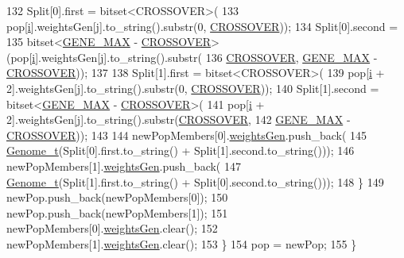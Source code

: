 \begin{DoxyCode}
132       Split[0].first = bitset<CROSSOVER>(
133           pop[\hyperlink{_comparision_pictures_2_createtest_image_8m_a6f6ccfcf58b31cb6412107d9d5281426}{i}].weightsGen[\hyperlink{_comparision_pictures_2_createtest_image_8m_ac86694252f8dfdb19aaeadc4b7c342c6}{j}].to\_string().substr(0, \hyperlink{_soil_math_types_8h_ae84e527452fcf9dfc8ef8fd0dd5cd598}{CROSSOVER}));
134       Split[0].second =
135           bitset<\hyperlink{_soil_math_types_8h_aa5e1eb1a998e5ed69af2076cf318df4b}{GENE\_MAX} - \hyperlink{_soil_math_types_8h_ae84e527452fcf9dfc8ef8fd0dd5cd598}{CROSSOVER}>(pop[\hyperlink{_comparision_pictures_2_createtest_image_8m_a6f6ccfcf58b31cb6412107d9d5281426}{i}].weightsGen[\hyperlink{_comparision_pictures_2_createtest_image_8m_ac86694252f8dfdb19aaeadc4b7c342c6}{j}].to\_string().substr(
136               \hyperlink{_soil_math_types_8h_ae84e527452fcf9dfc8ef8fd0dd5cd598}{CROSSOVER}, \hyperlink{_soil_math_types_8h_aa5e1eb1a998e5ed69af2076cf318df4b}{GENE\_MAX} - \hyperlink{_soil_math_types_8h_ae84e527452fcf9dfc8ef8fd0dd5cd598}{CROSSOVER}));
137 
138       Split[1].first = bitset<CROSSOVER>(
139           pop[\hyperlink{_comparision_pictures_2_createtest_image_8m_a6f6ccfcf58b31cb6412107d9d5281426}{i} + 2].weightsGen[\hyperlink{_comparision_pictures_2_createtest_image_8m_ac86694252f8dfdb19aaeadc4b7c342c6}{j}].to\_string().substr(0, \hyperlink{_soil_math_types_8h_ae84e527452fcf9dfc8ef8fd0dd5cd598}{CROSSOVER}));
140       Split[1].second = bitset<\hyperlink{_soil_math_types_8h_aa5e1eb1a998e5ed69af2076cf318df4b}{GENE\_MAX} - \hyperlink{_soil_math_types_8h_ae84e527452fcf9dfc8ef8fd0dd5cd598}{CROSSOVER}>(
141           pop[\hyperlink{_comparision_pictures_2_createtest_image_8m_a6f6ccfcf58b31cb6412107d9d5281426}{i} + 2].weightsGen[\hyperlink{_comparision_pictures_2_createtest_image_8m_ac86694252f8dfdb19aaeadc4b7c342c6}{j}].to\_string().substr(\hyperlink{_soil_math_types_8h_ae84e527452fcf9dfc8ef8fd0dd5cd598}{CROSSOVER},
142                                                       \hyperlink{_soil_math_types_8h_aa5e1eb1a998e5ed69af2076cf318df4b}{GENE\_MAX} - 
      \hyperlink{_soil_math_types_8h_ae84e527452fcf9dfc8ef8fd0dd5cd598}{CROSSOVER}));
143 
144       newPopMembers[0].\hyperlink{struct_pop_member_struct_a072fadb4863e0cf77b55ad3b46b62522}{weightsGen}.push\_back(
145           \hyperlink{_soil_math_types_8h_a58f6ab36d2cb0527a73caec36d14a0e0}{Genome\_t}(Split[0].first.to\_string() + Split[1].second.to\_string()));
146       newPopMembers[1].\hyperlink{struct_pop_member_struct_a072fadb4863e0cf77b55ad3b46b62522}{weightsGen}.push\_back(
147           \hyperlink{_soil_math_types_8h_a58f6ab36d2cb0527a73caec36d14a0e0}{Genome\_t}(Split[1].first.to\_string() + Split[0].second.to\_string()));
148     \}
149     newPop.push\_back(newPopMembers[0]);
150     newPop.push\_back(newPopMembers[1]);
151     newPopMembers[0].\hyperlink{struct_pop_member_struct_a072fadb4863e0cf77b55ad3b46b62522}{weightsGen}.clear();
152     newPopMembers[1].\hyperlink{struct_pop_member_struct_a072fadb4863e0cf77b55ad3b46b62522}{weightsGen}.clear();
153   \}
154   pop = newPop;
155 \}
\end{DoxyCode}


